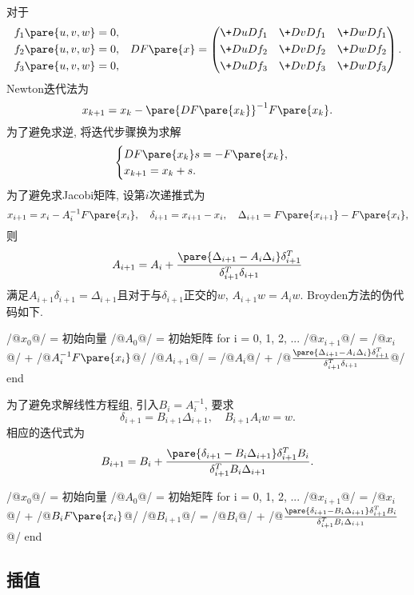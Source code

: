 \documentclass[20pt]{extarticle}
\begin{document}
对于
\[ \begin{aligned}
    f_1\pare{u,v,w} & = 0, \\
    f_2\pare{u,v,w} & = 0, \\
    f_3\pare{u,v,w} & = 0,
\end{aligned}\quad DF\pare{x} = \left(\begin{aligned}
    \+DuD{f_1} && \+DvD{f_1} && \+DwD{f_1} \\
    \+DuD{f_2} && \+DvD{f_2} && \+DwD{f_2} \\
    \+DuD{f_3} && \+DvD{f_3} && \+DwD{f_3} \\
\end{aligned}\right). \]
Newton迭代法为
\[ x_{k+1} = x_k - \pare{DF\pare{x_k}}^{-1}F\pare{x_k}. \]
为了避免求逆, 将迭代步骤换为求解
\[ \begin{cases}
    DF\pare{x_k}s = -F\pare{x_k},\\
    x_{k+1} = x_k + s.
\end{cases} \]
为了避免求Jacobi矩阵, 设第$i$次递推式为
\[ x_{i+1} = x_i - A_i^{-1}F\pare{x_i},\quad \delta_{i+1} = x_{i+1} - x_i,\quad \Delta_{i+1} = F\pare{x_{i+1}} - F\pare{x_i}, \]
则
\[ A_{i+1} = A_i + \frac{\pare{\Delta_{i+1} - A_i\Delta_i}\delta^T_{i+1}}{\delta_{i+1}^T\delta_{i+1}} \]
满足$A_{i+1}\delta_{i+1} = \Delta_{i+1}$且对于与$\delta_{i+1}$正交的$w$, $A_{i+1}w = A_iw$. Broyden方法的伪代码如下.
\begin{matlablst}
/@$x_0$@/ = 初始向量
/@$A_0$@/ = 初始矩阵
for i = 0, 1, 2, ...
    /@$x_{i+1}$@/ = /@$x_i$@/ + /@$A_i^{-1}F\pare{x_i}$@/
    /@$A_{i+1}$@/ = /@$A_i$@/ + /@$\frac{\pare{\Delta_{i+1} - A_i\Delta_i}\delta^T_{i+1}}{\delta_{i+1}^T\delta_{i+1}}$@/
end
\end{matlablst}
为了避免求解线性方程组, 引入$B_i=A_i^{-1}$, 要求
\[ \delta_{i+1} = B_{i+1}\Delta_{i+1},\quad B_{i+1}A_iw = w. \]
相应的迭代式为
\[ B_{i+1} = B_i + \frac{\pare{\delta_{i+1} - B_i\Delta_{i+1}}\delta_{i+1}^TB_i}{\delta_{i+1}^TB_i\Delta_{i+1}}. \]
\begin{matlablst}
/@$x_0$@/ = 初始向量
/@$A_0$@/ = 初始矩阵
for i = 0, 1, 2, ...
    /@$x_{i+1}$@/ = /@$x_i$@/ + /@$B_iF\pare{x_i}$@/
    /@$B_{i+1}$@/ = /@$B_i$@/ + /@$\frac{\pare{\delta_{i+1} - B_i\Delta_{i+1}}\delta_{i+1}^TB_i}{\delta_{i+1}^TB_i\Delta_{i+1}}$@/
end
\end{matlablst}



\subsection{插值} %
\label{sub:插值}
\end{document}
